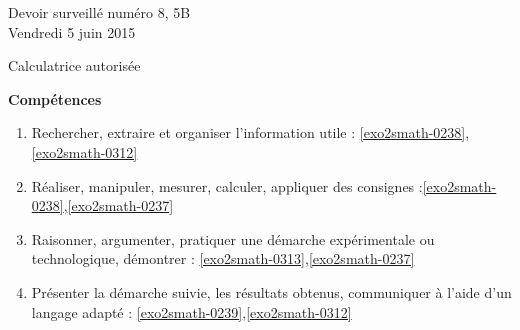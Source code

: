 \documentclass[a4paper,10pt]{article}
\begin{document}







\begin{feuilleDS}{Devoir surveillé numéro 8, 5B\\ \small Vendredi  5 juin 2015}
    \begin{center}
        Calculatrice autorisée
    \end{center}
\vspace{1cm}


{\bf Compétences}
\small
\begin{enumerate}
    \item
        Rechercher, extraire et organiser l'information utile : \ref{exo2smath-0238},\ref{exo2smath-0312}
    \item
        Réaliser, manipuler, mesurer, calculer, appliquer des consignes :\ref{exo2smath-0238},\ref{exo2smath-0237}
    \item
        Raisonner, argumenter, pratiquer une démarche expérimentale ou technologique, démontrer : \ref{exo2smath-0313},\ref{exo2smath-0237}
    \item 
        Présenter la démarche suivie, les résultats obtenus, communiquer à l'aide d’un langage adapté : \ref{exo2smath-0239},\ref{exo2smath-0312}
\end{enumerate}
\end{feuilleDS}
\end{document}
